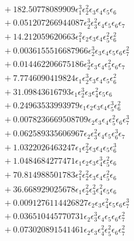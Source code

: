 \documentclass[10pt]{article}
\begin{document}
\begin{align*}
&{}  + 182.50778089909 \epsilon_{1}^{3} \epsilon_{2}^{2} \epsilon_{3} \epsilon_{4} \epsilon_{5} \epsilon_{6} \\
&{}  + 0.051207266944087 \epsilon_{2}^{3} \epsilon_{3}^{2} \epsilon_{4} \epsilon_{5} \epsilon_{6} \epsilon_{7} \\
&{}  + 14.212059620663 \epsilon_{1}^{2} \epsilon_{2} \epsilon_{3} \epsilon_{4} \epsilon_{5}^{2} \epsilon_{6}^{2} \\
&{}  + 0.0036155516687966 \epsilon_{2}^{3} \epsilon_{3} \epsilon_{4} \epsilon_{5} \epsilon_{6} \epsilon_{7}^{2} \\
&{}  + 0.014462206675186 \epsilon_{2}^{3} \epsilon_{3} \epsilon_{4} \epsilon_{5}^{2} \epsilon_{6} \epsilon_{7} \\
&{}  + 7.7746090419824 \epsilon_{1} \epsilon_{2}^{3} \epsilon_{3} \epsilon_{4} \epsilon_{5} \epsilon_{6}^{2} \\
&{}  + 31.09843616793 \epsilon_{1} \epsilon_{2}^{3} \epsilon_{3} \epsilon_{4}^{2} \epsilon_{5} \epsilon_{6} \\
&{}  + 0.24963533993979 \epsilon_{1} \epsilon_{2} \epsilon_{3} \epsilon_{4} \epsilon_{5}^{3} \epsilon_{6}^{2} \\
&{}  + 0.0078236669508709 \epsilon_{2} \epsilon_{3} \epsilon_{4} \epsilon_{5}^{2} \epsilon_{6} \epsilon_{7}^{3} \\
&{}  + 0.062589335606967 \epsilon_{2} \epsilon_{3}^{2} \epsilon_{4} \epsilon_{5} \epsilon_{6}^{3} \epsilon_{7} \\
&{}  + 1.0322026463247 \epsilon_{1} \epsilon_{2}^{2} \epsilon_{3} \epsilon_{4} \epsilon_{5} \epsilon_{6}^{3} \\
&{}  + 1.0484684277471 \epsilon_{1} \epsilon_{2} \epsilon_{3} \epsilon_{4}^{3} \epsilon_{5}^{2} \epsilon_{6} \\
&{}  + 70.814988501783 \epsilon_{1}^{2} \epsilon_{2}^{2} \epsilon_{3} \epsilon_{4} \epsilon_{5}^{2} \epsilon_{6} \\
&{}  + 36.668929025678 \epsilon_{1} \epsilon_{2}^{2} \epsilon_{3}^{2} \epsilon_{4}^{2} \epsilon_{5} \epsilon_{6} \\
&{}  + 0.0091276114426827 \epsilon_{2} \epsilon_{3} \epsilon_{4}^{2} \epsilon_{5} \epsilon_{6} \epsilon_{7}^{3} \\
&{}  + 0.036510445770731 \epsilon_{2} \epsilon_{3}^{3} \epsilon_{4} \epsilon_{5} \epsilon_{6} \epsilon_{7}^{2} \\
&{}  + 0.073020891541461 \epsilon_{2} \epsilon_{3} \epsilon_{4}^{2} \epsilon_{5}^{2} \epsilon_{6} \epsilon_{7}^{2} \\

\end{align*}
\end{document}
